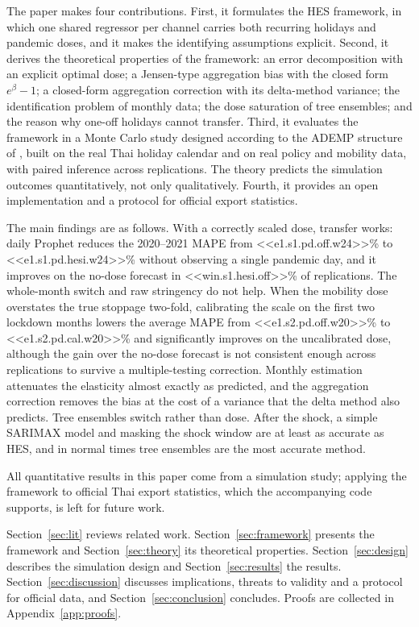 \documentclass{article}
\theoremstyle{plain}
\theoremstyle{definition}
\theoremstyle{remark}
\begin{document}
The paper makes four contributions. First, it formulates the HES framework, in which one shared regressor per channel carries both recurring holidays and pandemic doses, and it makes the identifying assumptions explicit. Second, it derives the theoretical properties of the framework: an error decomposition with an explicit optimal dose; a Jensen-type aggregation bias with the closed form $e^{\beta}-1$; a closed-form aggregation correction with its delta-method variance; the identification problem of monthly data; the dose saturation of tree ensembles; and the reason why one-off holidays cannot transfer. Third, it evaluates the framework in a Monte Carlo study designed according to the ADEMP structure of \citet{morris2019simulation}, built on the real Thai holiday calendar and on real policy and mobility data, with paired inference across replications. The theory predicts the simulation outcomes quantitatively, not only qualitatively. Fourth, it provides an open implementation and a protocol for official export statistics.

The main findings are as follows. With a correctly scaled dose, transfer works: daily Prophet reduces the 2020--2021 MAPE from <<e1.s1.pd.off.w24>>\% to <<e1.s1.pd.hesi.w24>>\% without observing a single pandemic day, and it improves on the no-dose forecast in <<win.s1.hesi.off>>\% of replications. The whole-month switch and raw stringency do not help. When the mobility dose overstates the true stoppage two-fold, calibrating the scale on the first two lockdown months lowers the average MAPE from <<e1.s2.pd.off.w20>>\% to <<e1.s2.pd.cal.w20>>\% and significantly improves on the uncalibrated dose, although the gain over the no-dose forecast is not consistent enough across replications to survive a multiple-testing correction. Monthly estimation attenuates the elasticity almost exactly as predicted, and the aggregation correction removes the bias at the cost of a variance that the delta method also predicts. Tree ensembles switch rather than dose. After the shock, a simple SARIMAX model and masking the shock window are at least as accurate as HES, and in normal times tree ensembles are the most accurate method.

All quantitative results in this paper come from a simulation study; applying the framework to official Thai export statistics, which the accompanying code supports, is left for future work.

Section~\ref{sec:lit} reviews related work. Section~\ref{sec:framework} presents the framework and Section~\ref{sec:theory} its theoretical properties. Section~\ref{sec:design} describes the simulation design and Section~\ref{sec:results} the results. Section~\ref{sec:discussion} discusses implications, threats to validity and a protocol for official data, and Section~\ref{sec:conclusion} concludes. Proofs are collected in Appendix~\ref{app:proofs}.
\end{document}
